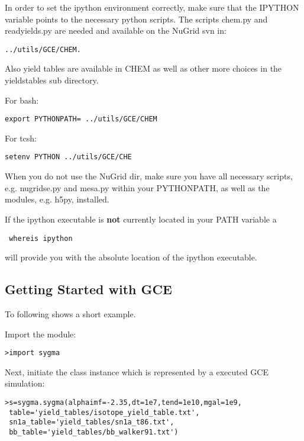 {In order to set the ipython environment correctly,
make sure that the IPYTHON variable points to the
necessary python scripts.
The scripts chem.py and read\textunderscore yields.py
are needed and available on the NuGrid svn in:

\begin{verbatim}
../utils/GCE/CHEM.
\end{verbatim}

Also yield tables are available in CHEM as well as
other more choices in the yields\textunderscore tables
sub directory.


For bash:
\begin{verbatim}
export PYTHONPATH= ../utils/GCE/CHEM
\end{verbatim}
For tcsh:
\begin{verbatim}
setenv PYTHON ../utils/GCE/CHE
\end{verbatim}

When you do not use the NuGrid dir, make sure you have
all necessary scripts, e.g. nugridse.py and mesa.py within
your PYTHONPATH, as well as the modules, e.g. h5py, installed.



If the ipython executable is {\bf not} currently  located in your PATH variable a
\newline
\begin{verbatim}
 whereis ipython
\end{verbatim}
will provide you with the absolute location of the ipython executable.  


\subsection{Getting Started with GCE}

To following shows a short example.

Import the module:

\begin{verbatim}
>import sygma
\end{verbatim}

Next, initiate the class instance which is represented
by a executed GCE simulation:

\begin{verbatim}
>s=sygma.sygma(alphaimf=-2.35,dt=1e7,tend=1e10,mgal=1e9,
 table='yield_tables/isotope_yield_table.txt',
 sn1a_table='yield_tables/sn1a_t86.txt',
 bb_table='yield_tables/bb_walker91.txt')
\end{verbatim}

}
